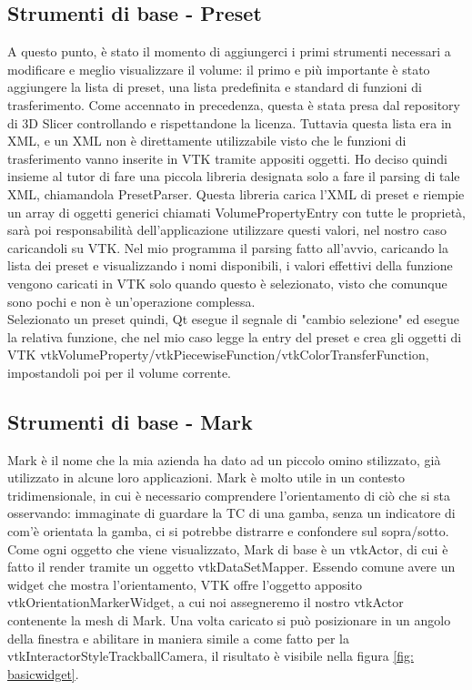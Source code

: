 \subsection{Strumenti di base - Preset}
A questo punto, è stato il momento di aggiungerci i primi strumenti necessari a modificare e meglio visualizzare il volume: il primo e più importante è stato aggiungere la lista di preset, una lista predefinita e standard di funzioni di trasferimento. Come accennato in precedenza, questa è stata presa dal repository di 3D Slicer controllando e rispettandone la licenza. Tuttavia questa lista era in XML, e un XML non è direttamente utilizzabile visto che le funzioni di trasferimento vanno inserite in VTK tramite appositi oggetti. Ho deciso quindi insieme al tutor di fare una piccola libreria designata solo a fare il parsing di tale XML, chiamandola PresetParser. Questa libreria carica l'XML di preset e riempie un array di oggetti generici chiamati VolumePropertyEntry con tutte le proprietà, sarà poi responsabilità dell'applicazione utilizzare questi valori, nel nostro caso caricandoli su VTK. Nel mio programma il parsing fatto all'avvio, caricando la lista dei preset e visualizzando i nomi disponibili, i valori effettivi della funzione vengono caricati in VTK solo quando questo è selezionato, visto che comunque sono pochi e non è un'operazione complessa.
\\
Selezionato un preset quindi, Qt esegue il segnale di "cambio selezione" ed esegue la relativa funzione, che nel mio caso legge la entry del preset e crea gli oggetti di VTK vtkVolumeProperty/vtkPiecewiseFunction/vtkColorTransferFunction, impostandoli poi per il volume corrente.

\subsection{Strumenti di base - Mark}
Mark è il nome che la mia azienda ha dato ad un piccolo omino stilizzato, già utilizzato in alcune loro applicazioni. Mark è molto utile in un contesto tridimensionale, in cui è necessario comprendere l'orientamento di ciò che si sta osservando: immaginate di guardare la TC di una gamba, senza un indicatore di com'è orientata la gamba, ci si potrebbe distrarre e confondere sul sopra/sotto. Come ogni oggetto che viene visualizzato, Mark di base è un vtkActor, di cui è fatto il render tramite un oggetto vtkDataSetMapper. Essendo comune avere un widget che mostra l'orientamento, VTK offre l'oggetto apposito vtkOrientationMarkerWidget, a cui noi assegneremo il nostro vtkActor contenente la mesh di Mark. Una volta caricato si può posizionare in un angolo della finestra e abilitare in maniera simile a come fatto per la vtkInteractorStyleTrackballCamera, il risultato è visibile nella figura \ref{fig: basicwidget}.

